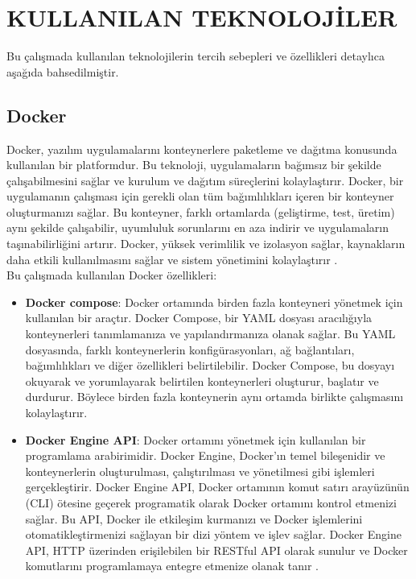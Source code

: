 \section{KULLANILAN TEKNOLOJİLER}
Bu çalışmada kullanılan teknolojilerin tercih sebepleri ve özellikleri detaylıca aşağıda bahsedilmiştir.
\subsection{Docker}\label{subsec:docker}
Docker, yazılım uygulamalarını konteynerlere paketleme ve dağıtma konusunda kullanılan bir platformdur. Bu teknoloji, uygulamaların bağımsız bir şekilde çalışabilmesini sağlar ve kurulum ve dağıtım süreçlerini kolaylaştırır. Docker, bir uygulamanın çalışması için gerekli olan tüm bağımlılıkları içeren bir konteyner oluşturmanızı sağlar. Bu konteyner, farklı ortamlarda (geliştirme, test, üretim) aynı şekilde çalışabilir, uyumluluk sorunlarını en aza indirir ve uygulamaların taşınabilirliğini artırır. Docker, yüksek verimlilik ve izolasyon sağlar, kaynakların daha etkili kullanılmasını sağlar ve sistem yönetimini kolaylaştırır \cite{docker}.\\
Bu çalışmada kullanılan Docker özellikleri:
\begin{itemize}
  \item \textbf{Docker compose}: Docker ortamında birden fazla konteyneri yönetmek için kullanılan bir araçtır. Docker Compose, bir YAML dosyası aracılığıyla konteynerleri tanımlamanıza ve yapılandırmanıza olanak sağlar. Bu YAML dosyasında, farklı konteynerlerin konfigürasyonları, ağ bağlantıları, bağımlılıkları ve diğer özellikleri belirtilebilir. Docker Compose, bu dosyayı okuyarak ve yorumlayarak belirtilen konteynerleri oluşturur, başlatır ve durdurur. Böylece birden fazla konteynerin aynı ortamda birlikte çalışmasını kolaylaştırır.
  \item \textbf{Docker Engine API}: Docker ortamını yönetmek için kullanılan bir programlama arabirimidir. Docker Engine, Docker'ın temel bileşenidir ve konteynerlerin oluşturulması, çalıştırılması ve yönetilmesi gibi işlemleri gerçekleştirir. Docker Engine API, Docker ortamının komut satırı arayüzünün (CLI) ötesine geçerek programatik olarak Docker ortamını kontrol etmenizi sağlar. Bu API, Docker ile etkileşim kurmanızı ve Docker işlemlerini otomatikleştirmenizi sağlayan bir dizi yöntem ve işlev sağlar. Docker Engine API, HTTP üzerinden erişilebilen bir RESTful API olarak sunulur ve Docker komutlarını programlamaya entegre etmenize olanak tanır \cite{docker_api_reference}.
\end{itemize}

